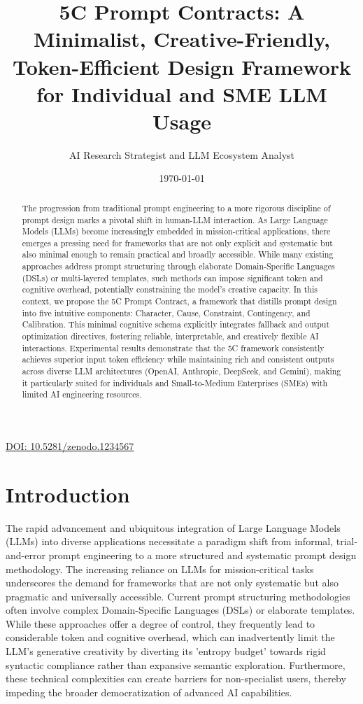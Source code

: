\documentclass[10pt, a4paper]{article}
\title{5C Prompt Contracts: A Minimalist, Creative-Friendly, Token-Efficient Design Framework for Individual and SME LLM Usage}
\author{AI Research Strategist and LLM Ecosystem Analyst}
\date{\today}
\begin{document}
\maketitle

\href{https://doi.org/10.5281/zenodo.1234567}{DOI: 10.5281/zenodo.1234567}

\begin{abstract}
The progression from traditional prompt engineering to a more rigorous discipline of prompt design marks a pivotal shift in human-LLM interaction. As Large Language Models (LLMs) become increasingly embedded in mission-critical applications, there emerges a pressing need for frameworks that are not only explicit and systematic but also minimal enough to remain practical and broadly accessible. While many existing approaches address prompt structuring through elaborate Domain-Specific Languages (DSLs) or multi-layered templates, such methods can impose significant token and cognitive overhead, potentially constraining the model's creative capacity. In this context, we propose the 5C Prompt Contract, a framework that distills prompt design into five intuitive components: Character, Cause, Constraint, Contingency, and Calibration. This minimal cognitive schema explicitly integrates fallback and output optimization directives, fostering reliable, interpretable, and creatively flexible AI interactions. Experimental results demonstrate that the 5C framework consistently achieves superior input token efficiency while maintaining rich and consistent outputs across diverse LLM architectures (OpenAI, Anthropic, DeepSeek, and Gemini), making it particularly suited for individuals and Small-to-Medium Enterprises (SMEs) with limited AI engineering resources.
\end{abstract}

\section{Introduction}
The rapid advancement and ubiquitous integration of Large Language Models (LLMs) into diverse applications necessitate a paradigm shift from informal, trial-and-error prompt engineering to a more structured and systematic prompt design methodology. The increasing reliance on LLMs for mission-critical tasks underscores the demand for frameworks that are not only systematic but also pragmatic and universally accessible. Current prompt structuring methodologies often involve complex Domain-Specific Languages (DSLs) or elaborate templates. While these approaches offer a degree of control, they frequently lead to considerable token and cognitive overhead, which can inadvertently limit the LLM's generative creativity by diverting its 'entropy budget' towards rigid syntactic compliance rather than expansive semantic exploration. Furthermore, these technical complexities can create barriers for non-specialist users, thereby impeding the broader democratization of advanced AI capabilities.
\end{document}
